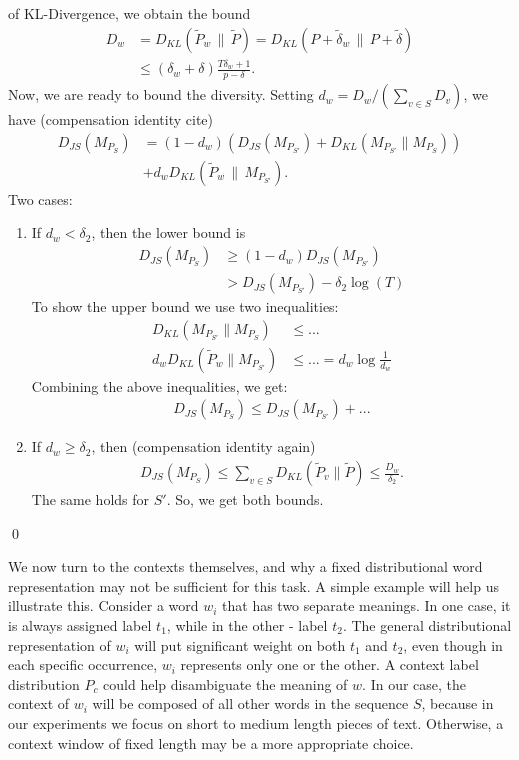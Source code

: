 of KL-Divergence, we obtain the bound
\begin{align*}
D_w &= D_{KL}(\tilde{P}_w\,\|\,\tilde{P})=
D_{KL}(P+\tilde{\delta}_w\,\|\, P+\tilde{\delta}) \\
&\leq
(\delta_w+\delta)\frac{T\delta_w+1}{p-\delta}.
\end{align*}
Now, we are ready to bound the diversity. Setting 
$d_w = D_w/(\sum_{v\in S}D_v)$, we have (compensation identity cite) 
\begin{align*}
D_{JS}(M_{P_S})&=(1-d_w)(D_{JS}(M_{P_{S'}}) +
D_{KL}(M_{P_{S'}}\|M_{P_S})) \\
&+ d_wD_{KL}(\tilde{P}_w\,\|\,M_{P_{S'}}).
\end{align*}
Two cases:
\begin{enumerate}
\item If $d_w<\delta_2$, then the lower bound is
\begin{align*}
D_{JS}(M_{P_S})&\geq (1-d_w)D_{JS}(M_{P_{S'}})\\
&>D_{JS}(M_{P_{S'}}) - \delta_2\log(T) 
\end{align*}
To show the upper bound we use two inequalities:
\begin{align*}
D_{KL}(M_{P_{S'}}\|M_{P_S})&\leq ...\\
d_w D_{KL}(\tilde{P}_w\|M_{P_{S'}})&\leq ...=d_w\log\frac{1}{d_w}
\end{align*}
Combining the above inequalities, we get:
\begin{align*}
D_{JS}(M_{P_S})\leq D_{JS}(M_{P_{S'}}) + ...
\end{align*}
\item If $d_w\geq \delta_2$, then (compensation identity again) 
\begin{align*}
D_{JS}(M_{P_S})\leq \sum_{v\in
S}D_{KL}(\tilde{P}_v\|\tilde{P})\leq \frac{D_w}{\delta_2}.
\end{align*}
The same holds for $S'$. So, we get both bounds.
\end{enumerate}
\qed

We now turn to the contexts themselves, and why a fixed distributional
word representation may not be sufficient for this task. A simple example will
help us illustrate this. Consider a word $w_i$ that has
two separate meanings. In one case, it is always assigned label $t_1$,
while in the other - label $t_2$. The general distributional
representation of $w_i$ will put significant weight on both $t_1$ and
$t_2$, even though in each specific occurrence, $w_i$ represents only one
or the other. A context label distribution $P_c$ could help disambiguate
the meaning of $w$. In our case, the context of $w_i$ will be composed of
all other words in the sequence $S$, because in our experiments we
focus on short to medium length pieces of text. Otherwise, a context
window of fixed length may be a more appropriate choice.

